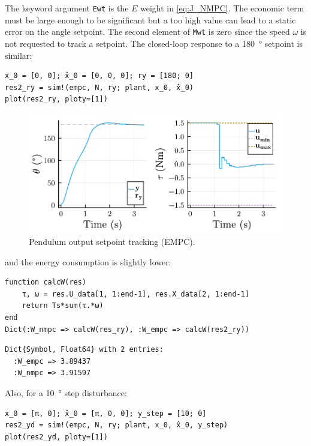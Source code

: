 The keyword argument \texttt{Ewt} is the $E$ weight in \eqref{eq:J_NMPC}. The economic term must be large enough to be significant but a too high value can lead to a static error on the angle setpoint. The second element of \texttt{Mwt} is zero since the speed $\omega$ is not requested to track a setpoint. The closed-loop response to a \SI{180}{\degree} setpoint is similar:

\begin{verbatim}
x_0 = [0, 0]; x̂_0 = [0, 0, 0]; ry = [180; 0]
res2_ry = sim!(empc, N, ry; plant, x_0, x̂_0)
plot(res2_ry, ploty=[1])
\end{verbatim}

\begin{figure}[h]
    \centering
    \includegraphics[width=\columnwidth]{fig/plot_EconomMPC1.pdf}
    \caption{Pendulum output setpoint tracking (EMPC).}
    \label{fig:plot_EconomMPC1}
\end{figure}

and the energy consumption is slightly lower:

\begin{verbatim}
function calcW(res)
    τ, ω = res.U_data[1, 1:end-1], res.X_data[2, 1:end-1]
    return Ts*sum(τ.*ω)
end
Dict(:W_nmpc => calcW(res_ry), :W_empc => calcW(res2_ry))
\end{verbatim}
\spacerepl
\begin{verbatim}
Dict{Symbol, Float64} with 2 entries:
  :W_empc => 3.89437
  :W_nmpc => 3.91597
\end{verbatim}

Also, for a \SI{10}{\degree} step disturbance:

\begin{verbatim}
x_0 = [π, 0]; x̂_0 = [π, 0, 0]; y_step = [10; 0]
res2_yd = sim!(empc, N, ry; plant, x_0, x̂_0, y_step)
plot(res2_yd, ploty=[1])
\end{verbatim}

